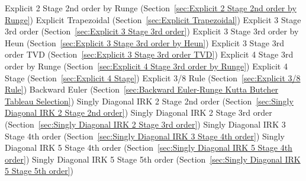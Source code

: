 \begin{list}{}
      \newline 
    Explicit 2 Stage 2nd order by Runge (Section~\ref{sec:Explicit 2 Stage 2nd order by Runge})
      \newline 
    Explicit Trapezoidal (Section~\ref{sec:Explicit Trapezoidal})
      \newline 
    Explicit 3 Stage 3rd order (Section~\ref{sec:Explicit 3 Stage 3rd order})
      \newline 
    Explicit 3 Stage 3rd order by Heun (Section~\ref{sec:Explicit 3 Stage 3rd order by Heun})
      \newline 
    Explicit 3 Stage 3rd order TVD (Section~\ref{sec:Explicit 3 Stage 3rd order TVD})
      \newline 
    Explicit 4 Stage 3rd order by Runge (Section~\ref{sec:Explicit 4 Stage 3rd order by Runge})
      \newline 
    Explicit 4 Stage (Section~\ref{sec:Explicit 4 Stage})
      \newline 
    Explicit 3/8 Rule (Section~\ref{sec:Explicit 3/8 Rule})
      \newline 
    Backward Euler (Section~\ref{sec:Backward Euler-Runge Kutta Butcher Tableau Selection})
      \newline 
    Singly Diagonal IRK 2 Stage 2nd order (Section~\ref{sec:Singly Diagonal IRK 2 Stage 2nd order})
      \newline 
    Singly Diagonal IRK 2 Stage 3rd order (Section~\ref{sec:Singly Diagonal IRK 2 Stage 3rd order})
      \newline 
    Singly Diagonal IRK 3 Stage 4th order (Section~\ref{sec:Singly Diagonal IRK 3 Stage 4th order})
      \newline 
    Singly Diagonal IRK 5 Stage 4th order (Section~\ref{sec:Singly Diagonal IRK 5 Stage 4th order})
      \newline 
    Singly Diagonal IRK 5 Stage 5th order (Section~\ref{sec:Singly Diagonal IRK 5 Stage 5th order})

\end{list}
